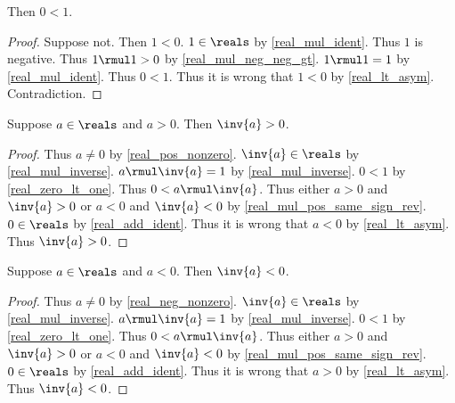 \begin{theorem}\label{real_zero_lt_one}
    Then $0 < 1$.
\end{theorem}
\begin{proof}
    Suppose not.
    Then $1 < 0$.
    $1\in\reals$ by \cref{real_mul_ident}.
    Thus $1$ is negative.
    Thus $1 \rmul 1 > 0$ by \cref{real_mul_neg_neg_gt}.
    $1 \rmul 1 = 1$ by \cref{real_mul_ident}.
    Thus $0 < 1$.
    Thus it is wrong that $1 < 0$ by \cref{real_lt_asym}.
    Contradiction.
\end{proof}

\begin{theorem}\label{real_inv_pos}
    Suppose $a\in\reals$ and $a > 0$.
    Then $\inv{a} > 0$.
\end{theorem}
\begin{proof}
    Thus $a \neq 0$ by \cref{real_pos_nonzero}.
    $\inv{a}\in\reals$ by \cref{real_mul_inverse}.
    $a \rmul \inv{a} = 1$ by \cref{real_mul_inverse}.
    $0 < 1$ by \cref{real_zero_lt_one}.
    Thus $0 < a \rmul \inv{a}$.
    Thus either $a > 0$ and $\inv{a} > 0$ or $a < 0$ and $\inv{a} < 0$ by \cref{real_mul_pos_same_sign_rev}.
    $0\in\reals$ by \cref{real_add_ident}.
    Thus it is wrong that $a < 0$ by \cref{real_lt_asym}.
    Thus $\inv{a} > 0$.
\end{proof}

\begin{theorem}\label{real_inv_neg}
    Suppose $a\in\reals$ and $a < 0$.
    Then $\inv{a} < 0$.
\end{theorem}
\begin{proof}
    Thus $a \neq 0$ by \cref{real_neg_nonzero}.
    $\inv{a}\in\reals$ by \cref{real_mul_inverse}.
    $a \rmul \inv{a} = 1$ by \cref{real_mul_inverse}.
    $0 < 1$ by \cref{real_zero_lt_one}.
    Thus $0 < a \rmul \inv{a}$.
    Thus either $a > 0$ and $\inv{a} > 0$ or $a < 0$ and $\inv{a} < 0$ by \cref{real_mul_pos_same_sign_rev}.
    $0\in\reals$ by \cref{real_add_ident}.
    Thus it is wrong that $a > 0$ by \cref{real_lt_asym}.
    Thus $\inv{a} < 0$.
\end{proof}

